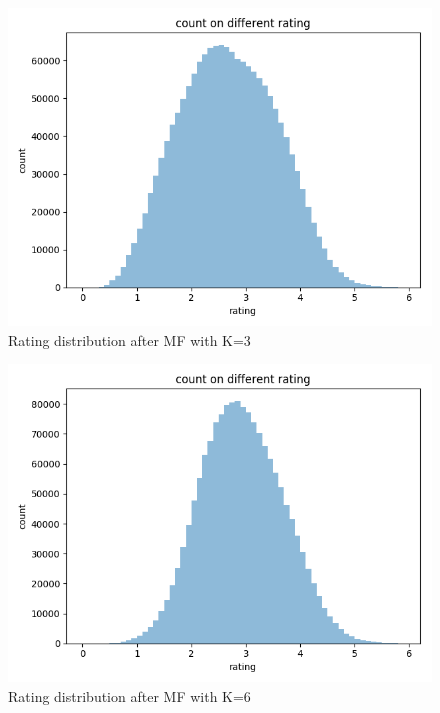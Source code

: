 \documentclass[journal, a4paper]{IEEEtran}
\begin{document}
\begin{figure}[!htb]
	\begin{center}
	\includegraphics[width=\columnwidth]{mf_cr_k3}
	\caption{Rating distribution after MF with K=3}
	\label{fig:mf_cr_k3}
	\end{center}
\end{figure}

\begin{figure}[!htb]
	\begin{center}
	\includegraphics[width=\columnwidth]{mf_cr_k6}
	\caption{Rating distribution after MF with K=6}
	\label{fig:mf_cr_k6}
	\end{center}
\end{figure}
\end{document}
